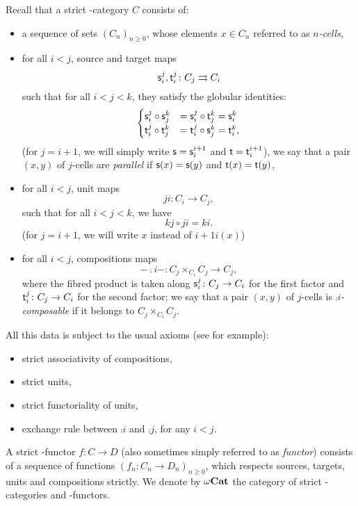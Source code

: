 \documentclass{amsart}
\newcommand{\src}[1]{\source{} #1}
\newcommand{\tgt}[1]{\target{} #1}
\begin{document}
\begin{paragr}
  Recall that a strict \oo-category $C$ consists of:
  \begin{itemize}
  \item a sequence of sets
  $(C_n)_{n\geq 0}$, whose elements $x \in C_n$ referred to as
  \emph{$n$\nbd-cells},
\item for all $i < j$, source and target maps
  \[
    \src_{i}^j,\tgt_{i}^j \colon C_j \rightrightarrows C_{i}
  \]
  such that for all $i < j <k$, they satisfy the globular identities:
  \[
    \begin{cases}
      \src_i^j \circ \src_{j}^k &= \src_{i}^j\circ \tgt_{j}^k =\src_i^k\\
      \tgt_{i}^j\circ \tgt_{j}^k &= \tgt_{i}^j \circ \src_{j}^k=\tgt_i^k,
    \end{cases}
  \]
  (for $j=i+1$, we will simply write $\src=\src_i^{i+1}$ and
  $\tgt=\tgt_i^{i+1}$), we say that a pair $(x,y)$ of $j$\nbd-cells
  are \emph{parallel} if $\src(x)=\src(y)$ and $\tgt(x)=\tgt(y)$,
\item for all $i < j$, unit maps
  \[
    \unit{j}{i} \colon C_i \to C_j,
  \]
  such that for all $i < j < k$, we have
  \[
    \unit{k}{j}\circ \unit{j}{i}=\unit{k}{i}.
  \]
  (for $j=i+1$, we will write $\unit{}{x}$ instead of $\unit{i+1}{i}(x)$)
\item for all $i < j$, compositions maps
  \[
    -\comp{i}- \colon C_j \times_{C_i} C_j \to C_j,
  \]
  where the fibred product is taken along $\src_i^j \colon C_j \to
  C_i$ for the first factor and $\tgt_i^j \colon C_j \to C_i$ for the
  second factor; we say that a pair $(x,y)$ of $j$\nbd-cells is
  \emph{$\comp{i}$\nbd-composable} if it belongs to $C_j \times_{C_i} C_j$.
\end{itemize}
All this data is subject to the usual axioms (see \cite[Section 14.2]{abgmmm:polybk} for example):
\begin{itemize}
  \item strict associativity of compositions,
  \item strict units,
  \item strict functoriality of units,
  \item  exchange rule between $\comp{i}$ and $\comp{j}$, for any
    $i <j$.
  \end{itemize}

  A strict \oo\nbd-functor $f \colon C \to D$ (also sometimes simply
  referred to as \emph{functor}) consists of a sequence of functions
  $(f_n \colon C_n \to D_n)_{n \geq 0}$,
  which respects sources, targets, units and compositions strictly. We
  denote by ${\omega}\mathbf{Cat}$ the category of strict \oo-categories and
  \oo\nbd-functors.
\end{paragr}
\end{document}
